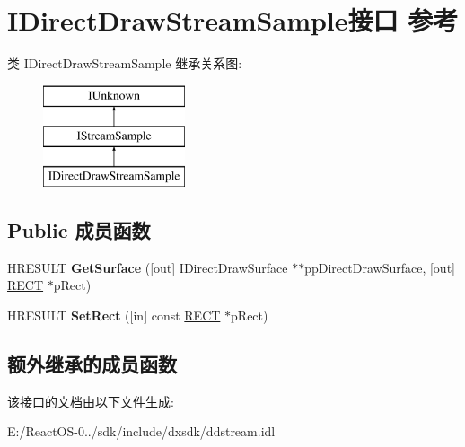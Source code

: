 \hypertarget{interface_i_direct_draw_stream_sample}{}\section{I\+Direct\+Draw\+Stream\+Sample接口 参考}
\label{interface_i_direct_draw_stream_sample}
类 I\+Direct\+Draw\+Stream\+Sample 继承关系图\+:\begin{figure}[H]
\begin{center}
\leavevmode
\includegraphics[height=3.000000cm]{interface_i_direct_draw_stream_sample}
\end{center}
\end{figure}
\subsection*{Public 成员函数}
\begin{DoxyCompactItemize}
\item 
\mbox{\label{interface_i_direct_draw_stream_sample_a8758b12f9ed4ab63373b6402cca29667}} 
H\+R\+E\+S\+U\+LT {\bfseries Get\+Surface} (\mbox{[}out\mbox{]} I\+Direct\+Draw\+Surface $\ast$$\ast$pp\+Direct\+Draw\+Surface, \mbox{[}out\mbox{]} \hyperlink{structtag_r_e_c_t}{R\+E\+CT} $\ast$p\+Rect)
\item 
\mbox{\label{interface_i_direct_draw_stream_sample_aa2dcff0b98188ae37a7164fec714bfb5}} 
H\+R\+E\+S\+U\+LT {\bfseries Set\+Rect} (\mbox{[}in\mbox{]} const \hyperlink{structtag_r_e_c_t}{R\+E\+CT} $\ast$p\+Rect)
\end{DoxyCompactItemize}
\subsection*{额外继承的成员函数}


该接口的文档由以下文件生成\+:\begin{DoxyCompactItemize}
\item 
E\+:/\+React\+O\+S-\/0../sdk/include/dxsdk/ddstream.\+idl\end{DoxyCompactItemize}
